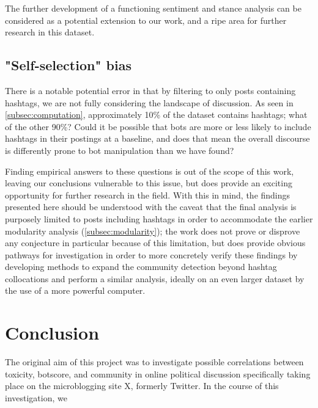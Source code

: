 \documentclass[a4paper,11pt]{article}  %
\begin{document}
	The further development of a functioning sentiment and stance analysis can be considered as a potential extension to our work, and a ripe area for further research in this dataset.

	\subsection{"Self-selection" bias}
	\label{subsec:bias}
	There is a notable potential error in that by filtering to only posts containing hashtags, we are not fully considering the landscape of discussion. As seen in \autoref{subsec:computation}, approximately 10\% of the dataset contains hashtags; what of the other 90\%? Could it be possible that bots are more or less likely to include hashtags in their postings at a baseline, and does that mean the overall discourse is differently prone to bot manipulation than we have found? 
	
	Finding empirical answers to these questions is out of the scope of this work, leaving our conclusions vulnerable to this issue, but does provide an exciting opportunity for further research in the field. With this in mind, the findings presented here should be understood with the caveat that the final analysis is purposely limited to posts including hashtags in order to accommodate the earlier modularity analysis (\autoref{subsec:modularity}); the work does not prove or disprove any conjecture in particular because of this limitation, but does provide obvious pathways for investigation in order to more concretely verify these findings by developing methods to expand the community detection beyond hashtag collocations and perform a similar analysis, ideally on an even larger dataset by the use of a more powerful computer.

	\section{Conclusion}
	\label{sec:conclusion}
	The original aim of this project was to investigate possible correlations between toxicity, botscore, and community in online political discussion specifically taking place on the microblogging site X, formerly Twitter. In the course of this investigation, we 
	
\end{document}
